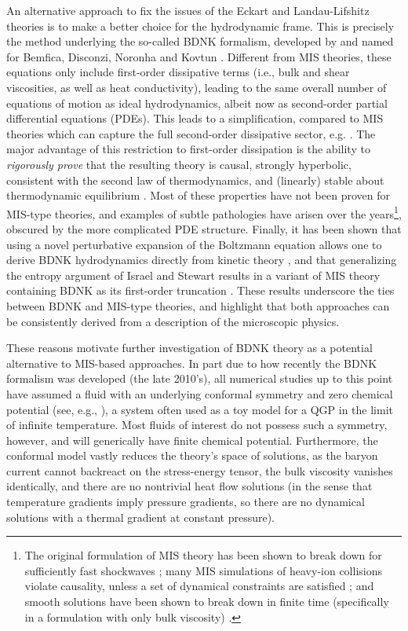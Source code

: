 \documentclass[%
notitlepage,
superscriptaddress,
nofootinbib,
amsmath,
amssymb,
aps,
twocolumn
]{revtex4-1}
\begin{document}
An alternative approach to fix the issues of the Eckart and Landau-Lifshitz
theories is to make a better choice for the hydrodynamic frame.  This is
precisely the method underlying the so-called BDNK formalism, developed by
and named for Bemfica, Disconzi, Noronha
\cite{Bemfica_2018,Bemfica:2020zjp} and Kovtun \cite{Kovtun_2019}.  
Different from MIS theories, these equations only include first-order
dissipative terms (i.e., bulk and shear viscosities, as well as heat
conductivity), leading to the same overall number of equations of motion as ideal
hydrodynamics, albeit now as second-order partial differential equations (PDEs). 
This leads to a simplification, compared to MIS theories which can capture
the full second-order dissipative sector, e.g. \cite{Denicol_2012}.
The major advantage of this restriction to first-order dissipation is the 
ability to \textit{rigorously prove} that the resulting theory is causal,
strongly hyperbolic, consistent with the second law of thermodynamics, and (linearly) stable
about thermodynamic equilibrium \cite{Bemfica:2020zjp}.  
Most of these properties have not been
proven for MIS-type theories, and examples of subtle pathologies have
arisen over the years\footnote{The original formulation of MIS theory has
  been shown to break down for sufficiently fast shockwaves
  \cite{Olson_1990_shocks}; many MIS simulations of heavy-ion collisions
  violate causality, unless a set of dynamical constraints are satisfied
  \cite{Bemfica:2020xym,Plumberg:2021bme}; and smooth solutions have been
  shown to break down in finite time (specifically in a formulation with
  only bulk viscosity) \cite{Disconzi:2020ijk}.}, obscured by the more
  complicated PDE structure.  
Finally, it has been shown that using a novel perturbative expansion of the Boltzmann equation allows one to derive BDNK hydrodynamics directly from kinetic theory \cite{Rocha:2022ind}, and that generalizing the entropy argument of Israel and Stewart \cite{Israel_1979} results in a variant of MIS theory containing BDNK as its first-order truncation \cite{Noronha:2021syv}.  These results underscore the ties between BDNK and MIS-type theories, and highlight that both approaches can be consistently derived from a description of the microscopic physics.

  These reasons motivate further investigation
  of BDNK theory as a potential alternative to MIS-based approaches.
  In part due to how recently the BDNK formalism was developed (the late
  2010's), all numerical studies up to this point have assumed a fluid with an
  underlying conformal symmetry and zero chemical potential (see, e.g.,
  \cite{Pandya_2021,Pandya:2022pif,Bantilan:2022ech}), a system often used
  as a toy model for a QGP in the limit of infinite temperature.  Most fluids of
  interest do not possess such a symmetry, however, and will generically
  have finite chemical potential.  Furthermore, the conformal model vastly
  reduces the theory's space of solutions, as the baryon current cannot
  backreact on the stress-energy tensor, the bulk viscosity vanishes
  identically, and there are no nontrivial heat flow solutions (in the
  sense that temperature gradients imply pressure gradients, so there are
  no dynamical solutions with a thermal gradient at constant pressure).
\end{document}
